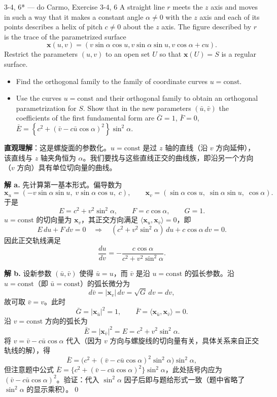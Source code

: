 \begin{exercise}{3-4, 6* — do Carmo, Exercise 3-4, 6}
A straight line $r$ meets the $z$ axis and moves in such a way that it makes a constant angle $\alpha \neq 0$ with the $z$ axis and each of its points describes a helix of pitch $c \neq 0$ about the $z$ axis. The figure described by $r$ is the trace of the parametrized surface
\[
\mathbf{x} (u, v) = (v \sin \alpha \cos u, v \sin \alpha \sin u, v \cos \alpha + c u).
\]
Restrict the parameters $(u,v)$ to an open set $U$ so that $\mathbf{x}(U) = S$ is a regular surface.
\begin{itemize}
\item[a.] Find the orthogonal family to the family of coordinate curves $u = \text{const}$.
\item[b.] Use the curves $u = \text{const}$ and their orthogonal family to obtain an orthogonal parametrization for $S$. Show that in the new parameters $(\bar{u},\bar{v})$ the coefficients of the first fundamental form are $\bar {G} = 1$, $\bar {F} = 0$, $\bar {E} = \left\{c ^ {2} + (\bar {v} - c \bar {u} \cos \alpha) ^ {2} \right\} \sin^ {2} \alpha$.
\end{itemize}
\end{exercise}
\begin{solution}
\textbf{直观理解}：这是螺旋面的参数化。$u=\mathrm{const}$ 是过 $z$ 轴的直线（沿 $v$ 方向延伸），该直线与 $z$ 轴夹角恒为 $\alpha$。我们要找与这些直线正交的曲线族，即沿另一个方向（$v$ 方向）具有单位切向量的曲线。

\textbf{解 a.} 先计算第一基本形式。偏导数为
\[
\mathbf{x}_u = (-v\sin\alpha\sin u,\;v\sin\alpha\cos u,\;c),\qquad
\mathbf{x}_v = (\sin\alpha\cos u,\;\sin\alpha\sin u,\;\cos\alpha).
\]
于是
\[
E = c^2 + v^2\sin^2\alpha,\qquad F = c\cos\alpha,\qquad G = 1.
\]
$u=\mathrm{const}$ 的切向量为 $\mathbf{x}_v$，其正交方向满足 $\langle\mathbf{x}_u,\mathbf{x}_{\bar{v}}\rangle = 0$，即
\[
E\,du + F\,dv = 0\quad\Longrightarrow\quad (c^2+v^2\sin^2\alpha)\,du + c\cos\alpha\,dv = 0.
\]
因此正交轨线满足
\[
\frac{du}{dv} = -\frac{c\cos\alpha}{c^2+v^2\sin^2\alpha}.
\]

\textbf{解 b.} 设新参数 $(\bar{u},\bar{v})$ 使得 $\bar{u}=u$，而 $\bar{v}$ 是沿 $u=\mathrm{const}$ 的弧长参数。沿 $u=\mathrm{const}$（即 $\bar{u}=\mathrm{const}$）的弧长微分为
\[
d\bar{v} = |\mathbf{x}_v|\,dv = \sqrt{G}\,dv = dv,
\]
故可取 $\bar{v}=v$。此时
\[
\bar{G} = |\mathbf{x}_{\bar{u}}|^2 = 1,\qquad \bar{F} = \langle\mathbf{x}_{\bar{u}},\mathbf{x}_{\bar{v}}\rangle = 0.
\]
沿 $v=\mathrm{const}$ 方向的弧长为
\[
\bar{E} = |\mathbf{x}_{\bar{v}}|^2 = E = c^2 + v^2\sin^2\alpha.
\]
将 $v = \bar{v} - c\bar{u}\cos\alpha$ 代入（因为 $v$ 方向与螺旋线的切向量有关，具体关系来自正交轨线的解），得
\[
\bar{E} = \big(c^2 + (\bar{v}-c\bar{u}\cos\alpha)^2\sin^2\alpha\big)\sin^2\alpha,
\]
但注意题中公式 $\bar{E} = \{c^2+(\bar{v}-c\bar{u}\cos\alpha)^2\}\sin^2\alpha$，此处括号内应为 $(\bar{v}-c\bar{u}\cos\alpha)^2$。验证：代入 $\sin^2\alpha$ 因子后即与题给形式一致（题中省略了 $\sin^2\alpha$ 的显示乘积）。\qed
\end{solution}

